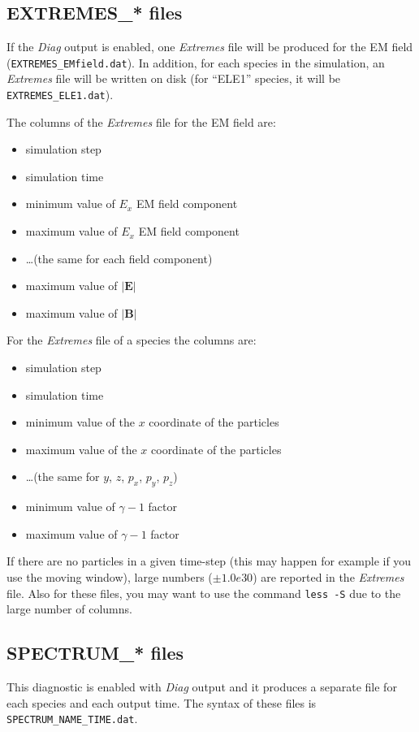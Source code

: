 \documentclass[11pt,a4paper]{report}
\begin{document}
\subsection{EXTREMES\_* files}
If the \emph{Diag} output is enabled, one \emph{Extremes} file will be produced for the EM field (\verb+EXTREMES_EMfield.dat+). In addition, for each species in the simulation, an \emph{Extremes} file will be written on disk (for ``ELE1'' species, it will be \verb+EXTREMES_ELE1.dat+).

The columns of the \emph{Extremes} file for the EM field are:
\begin{itemize}
\item simulation step
\item simulation time
\item minimum value of $E_x$ EM field component
\item maximum value of $E_x$ EM field component
\item \ldots (the same for each field component)
\item maximum value of ${\vert\mathbf{E}\vert}$
\item maximum value of ${\vert\mathbf{B}\vert}$
\end{itemize}
For the \emph{Extremes} file of a species the columns are:
\begin{itemize}
\item simulation step
\item simulation time
\item minimum value of the $x$ coordinate of the particles
\item maximum value of the $x$ coordinate of the particles
\item \ldots (the same for $y$, $z$, $p_x$, $p_y$, $p_z$)
\item minimum value of $\gamma - 1$ factor
\item maximum value of $\gamma - 1$ factor
\end{itemize}
If there are no particles in a given time-step (this may happen for example if you use the moving window), large numbers ($\pm 1.0e30$) are reported in the  \emph{Extremes} file.
Also for these files, you may want to use the command \verb+less -S+ due to the large number of columns.
\subsection{SPECTRUM\_* files}
This diagnostic is enabled with \emph{Diag} output and it produces a separate file for each species and each output time. The syntax of these files is \verb+SPECTRUM_NAME_TIME.dat+.
\end{document}

